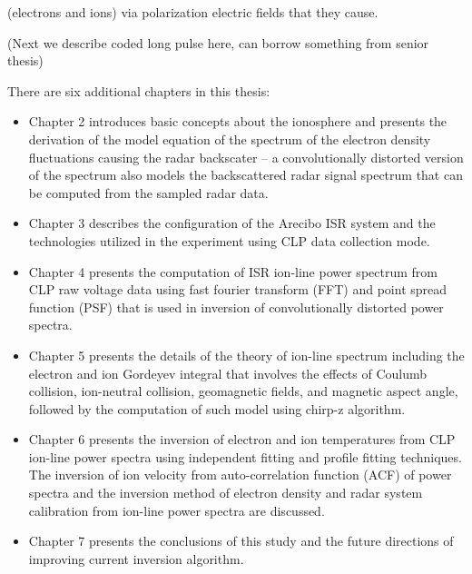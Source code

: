 (electrons and ions) via polarization electric fields that they cause.

(Next we describe coded long pulse here, can borrow something from senior thesis)

There are six additional chapters in this thesis:
\begin{itemize}
    \item Chapter 2 introduces basic concepts about the ionosphere and presents the derivation of the model equation of the spectrum of the electron density fluctuations causing the radar backscater -- a convolutionally distorted version of the spectrum also models the backscattered radar signal spectrum that can be computed from the sampled radar data.
    \item Chapter 3 describes the configuration of the Arecibo ISR system and the technologies utilized in the experiment using CLP data collection mode.
    \item Chapter 4 presents the computation of ISR ion-line power spectrum from CLP raw voltage data using fast fourier transform (FFT) and point spread function (PSF) that is used in inversion of convolutionally distorted power spectra.
    \item Chapter 5 presents the details of the theory of ion-line spectrum including the electron and ion Gordeyev integral that involves the effects of Coulumb collision, ion-neutral collision, geomagnetic fields, and magnetic aspect angle, followed by the computation of such model using chirp-z algorithm.
    \item Chapter 6 presents the inversion of electron and ion temperatures from CLP ion-line power spectra using independent fitting and profile fitting techniques. The inversion of ion velocity from auto-correlation function (ACF) of power spectra and the inversion method of electron density and radar system calibration from ion-line power spectra are discussed.
    \item Chapter 7 presents the conclusions of this study and the future directions of improving current inversion algorithm.
\end{itemize}